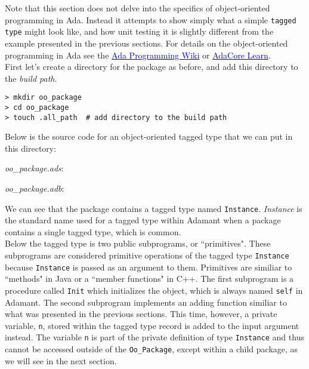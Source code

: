 Note that this section does not delve into the specifics of object-oriented programming in Ada. Instead it attempts to show simply what a simple \texttt{tagged type} might look like, and how unit testing it is slightly different from the example presented in the previous sections. For details on the object-oriented programming in Ada see the \href{https://en.wikibooks.org/wiki/Ada_Programming/Object_Orientation}{\textcolor{blue}{Ada Programming Wiki}} or \href{https://learn.adacore.com/courses/intro-to-ada/chapters/object_oriented_programming.html}{\textcolor{blue}{AdaCore Learn}}. \\

First let's create a directory for the package as before, and add this directory to the \textit{build path}.

\vspace{5mm} %
\begin{verbatim}
> mkdir oo_package 
> cd oo_package 
> touch .all_path  # add directory to the build path
\end{verbatim}
\vspace{5mm} %

Below is the source code for an object-oriented tagged type that we can put in this directory:

\textit{oo\_package.ads}:


\textit{oo\_package.adb}:


We can see that the package contains a tagged type named \texttt{Instance}. \textit{Instance} is the standard name used for a tagged type within Adamant when a package contains a single tagged type, which is common. \\

Below the tagged type is two public subprograms, or ``primitives". These subprograms are considered primitive operations of the tagged type \texttt{Instance} because \texttt{Instance} is passed as an argument to them. Primitives are similiar to ``methods" in Java or a ``member functions" in C++. The first subprogram is a procedure called \texttt{Init} which initializes the object, which is always named \texttt{self} in Adamant. The second subprogram implements an adding function similiar to what was presented in the previous sections. This time, however, a private variable, \texttt{n}, stored within the tagged type record is added to the input argument instead. The variable \texttt{n} is part of the private definition of type \texttt{Instance} and thus cannot be accessed outside of the \texttt{Oo\_Package}, except within a child package, as we will see in the next section.

